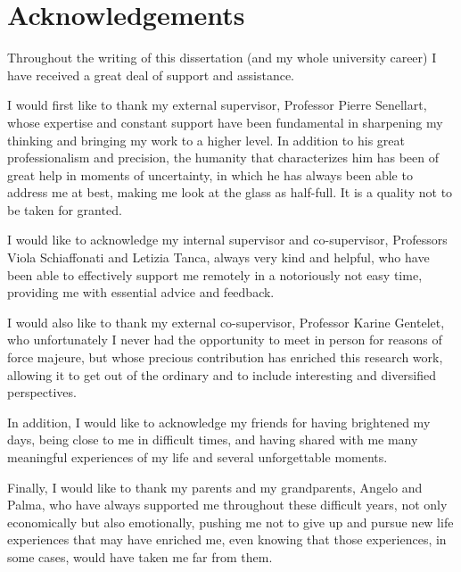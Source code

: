 \chapter*{Acknowledgements}


Throughout the writing of this dissertation (and my whole university career) I have received a great deal of support and assistance.

I would first like to thank my external supervisor, Professor Pierre Senellart, whose expertise and constant support have been fundamental in sharpening my thinking and bringing my work to a higher level. In addition to his great professionalism and precision, the humanity that characterizes him has been of great help in moments of uncertainty, in which he has always been able to address me at best, making me look at the glass as half-full. It is a quality not to be taken for granted.

I would like to acknowledge my internal supervisor and co-supervisor, Professors Viola Schiaffonati and Letizia Tanca, always very kind and helpful, who have been able to effectively support me remotely in a notoriously not easy time, providing me with essential advice and feedback.

I would also like to thank my external co-supervisor, Professor Karine Gentelet, who unfortunately I never had the opportunity to meet in person for reasons of force majeure, but whose precious contribution has enriched this research work, allowing it to get out of the ordinary and to include interesting and diversified perspectives.

In addition, I would like to acknowledge my friends for having brightened my days, being close to me in difficult times, and having shared with me many meaningful experiences of my life and several unforgettable moments.

Finally, I would like to thank my parents and my grandparents, Angelo and Palma, who have always supported me throughout these difficult years, not only economically but also emotionally, pushing me not to give up and pursue new life experiences that may have enriched me, even knowing that those experiences, in some cases, would have taken me far from them.
